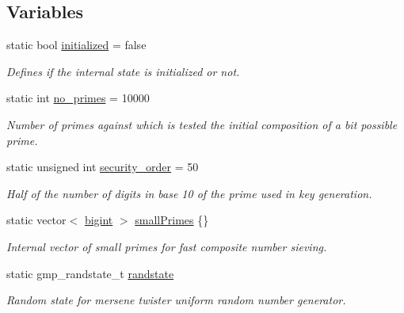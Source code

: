 \subsection*{Variables}
\begin{DoxyCompactItemize}
\item 
static bool \mbox{\hyperlink{namespaceelGamal_1_1anonymous__namespace_02elGamal_8cpp_03_a84c2d63e328c14f55fe67906cfd6a9ad}{initialized}} = false
\begin{DoxyCompactList}\small\item\em Defines if the internal state is initialized or not. \end{DoxyCompactList}\item 
static int \mbox{\hyperlink{namespaceelGamal_1_1anonymous__namespace_02elGamal_8cpp_03_a7175fc639adb9e72cfc1bde02c26a5cc}{no\+\_\+primes}} = 10000
\begin{DoxyCompactList}\small\item\em Number of primes against which is tested the initial composition of a bit possible prime. \end{DoxyCompactList}\item 
static unsigned int \mbox{\hyperlink{namespaceelGamal_1_1anonymous__namespace_02elGamal_8cpp_03_ad9ef8cca8d7c022e5348cef34a0bca16}{security\+\_\+order}} = 50
\begin{DoxyCompactList}\small\item\em Half of the number of digits in base 10 of the prime used in key generation. \end{DoxyCompactList}\item 
static vector$<$ \mbox{\hyperlink{namespaceelGamal_ab2883bf41ce8d738e2428c8ae81b0245}{bigint}} $>$ \mbox{\hyperlink{namespaceelGamal_1_1anonymous__namespace_02elGamal_8cpp_03_a8de2fd78da2639622fdba15243c420a5}{small\+Primes}} \{\}
\begin{DoxyCompactList}\small\item\em Internal vector of small primes for fast composite number sieving. \end{DoxyCompactList}\item 
static gmp\+\_\+randstate\+\_\+t \mbox{\hyperlink{namespaceelGamal_1_1anonymous__namespace_02elGamal_8cpp_03_af09e61b19359526682e6b7bf5b98f828}{randstate}}
\begin{DoxyCompactList}\small\item\em Random state for mersene twister uniform random number generator. \end{DoxyCompactList}\end{DoxyCompactItemize}



